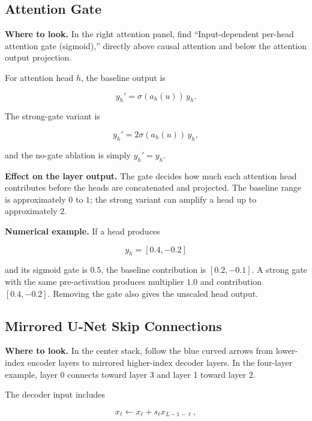 \documentclass[11pt,a4paper]{article}
\begin{document}
\subsection{Attention Gate}

\textbf{Where to look.} In the right attention panel, find
``Input-dependent per-head attention gate (sigmoid),'' directly above causal
attention and below the attention output projection.

For attention head $h$, the baseline output is

\begin{equation}
  y_h'=\sigma(a_h(u))\,y_h.
\end{equation}

The strong-gate variant is

\begin{equation}
  y_h'=2\sigma(a_h(u))\,y_h,
\end{equation}

and the no-gate ablation is simply $y_h'=y_h$.

\textbf{Effect on the layer output.} The gate decides how much each attention
head contributes before the heads are concatenated and projected. The baseline
range is approximately $0$ to $1$; the strong variant can amplify a head up to
approximately $2$.

\textbf{Numerical example.} If a head produces

\begin{equation}
  y_h=[0.4,-0.2]
\end{equation}

and its sigmoid gate is $0.5$, the baseline contribution is
$[0.2,-0.1]$. A strong gate with the same pre-activation produces multiplier
$1.0$ and contribution $[0.4,-0.2]$. Removing the gate also gives the unscaled
head output.

\subsection{Mirrored U-Net Skip Connections}

\textbf{Where to look.} In the center stack, follow the blue curved arrows from
lower-index encoder layers to mirrored higher-index decoder layers. In the
four-layer example, layer 0 connects toward layer 3 and layer 1 toward layer 2.

The decoder input includes

\begin{equation}
  x_\ell\leftarrow x_\ell+s_\ell x_{L-1-\ell},
\end{equation}
\end{document}
